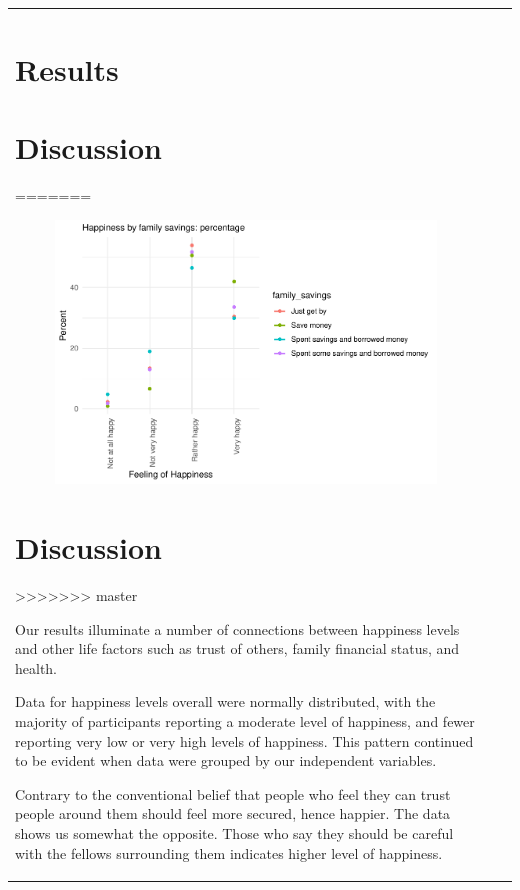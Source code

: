\documentclass[man, fleqn, noextraspace,floatsintext]{apa6}
\begin{document}
\begin{tabular}{l|l|r}
\hypertarget{results}{%
\section{Results}\label{results}}

\hypertarget{discussion}{%
\section{Discussion}\label{discussion}}
=======
\begin{figure}
\centering
\includegraphics{610_final_files/figure-latex/happiness by family savings tables and figures-1.pdf}
\caption{}
\end{figure}

\section{Discussion}\label{discussion}
>>>>>>> master

Our results illuminate a number of connections between happiness levels
and other life factors such as trust of others, family financial status,
and health.

Data for happiness levels overall were normally distributed, with the
majority of participants reporting a moderate level of happiness, and
fewer reporting very low or very high levels of happiness. This pattern
continued to be evident when data were grouped by our independent
variables.

Contrary to the conventional belief that people who feel they can trust
people around them should feel more secured, hence happier. The data
shows us somewhat the opposite. Those who say they should be careful
with the fellows surrounding them indicates higher level of happiness.


\end{tabular}
\end{document}
